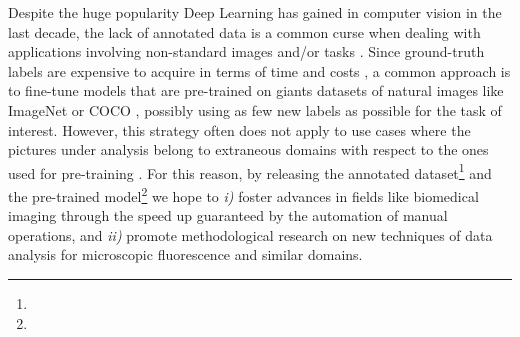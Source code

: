 Despite the huge popularity Deep Learning has gained in computer vision in the last decade, the lack of annotated data is a common curse when dealing with applications involving non-standard images and/or tasks \cite{curse_dataset_annotation}. 
Since ground-truth labels are expensive to acquire in terms of time and costs \cite{vija2009annotationcost, mullen2019comparing}, a common approach is to fine-tune models that are pre-trained on giants datasets of natural images like ImageNet \cite{ImageNet} or COCO \cite{COCO}, possibly using as few new labels as possible for the task of interest. 
However, this strategy often does not apply to use cases where the pictures under analysis belong to extraneous domains with respect to the ones used for pre-training \cite{TL_medical_imaging}.
For this reason, by releasing the annotated dataset\footnote{\dataset} and the pre-trained model\footnote{\linkmodel} we hope to \textit{i)} foster advances in fields like biomedical imaging through the speed up guaranteed by the automation of manual operations, and \textit{ii)} promote methodological research on new techniques of data analysis for microscopic fluorescence and similar domains.
